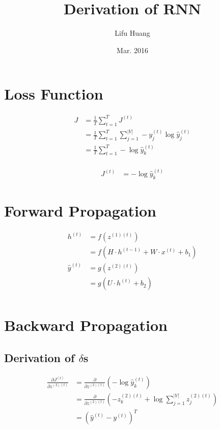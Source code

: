 \documentclass{article}
\title{Derivation of RNN}
\author{Lifu Huang}
\date{Mar. 2016}
\begin{document}
	\maketitle
	\section{Loss Function}
	\begin{equation}
	\begin{aligned}
		J &= \frac{1}{T}\sum_{t=1}^{T} J^{(t)} \\
		&= \frac{1}{T}\sum_{t=1}^{T} \sum_{j=1}^{|V|} -y^{(t)}_j \log \hat{y}^{(t)}_j \\
		&= \frac{1}{T} \sum_{t=1}^T -\log{\hat{y}_k^{(t)}}	\\
	\end{aligned}
	\end{equation}
	
	\begin{equation}
	\begin{aligned}	
		J^{(t)} &= -\log{\hat{y}^{(t)}_k}
	\end{aligned}
	\end{equation}
	
	\section{Forward Propagation}
	\begin{equation}
	\begin{aligned}
		h^{(t)} &= f(z^{(1)(t)}) \\
		&= f(H \cdot h^{(t-1)} + W \cdot x^{(t)} + b_1) \\
		\hat{y}^{(t)} &= g(z^{(2)(t)}) \\
		&= g(U \cdot h^{(t)} + b_2) \\
	\end{aligned}
	\end{equation}
	
	\section{Backward Propagation}
	\subsection{Derivation of $\delta$s}
	\begin{equation}
	\begin{aligned}
		\frac{\partial J^{(t)}}{\partial z^{(2)(t)}} &= \frac{\partial}{\partial z^{(2)(t)}} (-\log{\hat{y}^{(t)}_k}) \\
		&= \frac{\partial}{\partial z^{(2)(t)}} (-z^{(2)(t)}_k + \log{\sum_{j=1}^{|V|} z^{(2)(t)}_j}) \\
		&= (\hat{y}^{(t)} - y^{(t)})^T \\
	\end{aligned}
	\end{equation}
	
\end{document}
